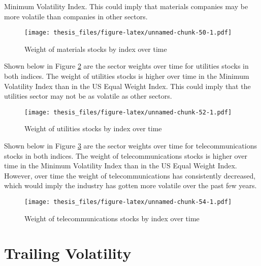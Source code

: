 \documentclass[12pt,twoside]{reedthesis}
\theoremstyle{definition}
\theoremstyle{definition}
\theoremstyle{definition}
\theoremstyle{remark}
\begin{document}
Minimum Volatility Index. This could imply that materials companies may
be more volatile than companies in other sectors.
\begin{figure}[htbp]
\centering
\texttt{[image: thesis\_files/figure-latex/unnamed-chunk-50-1.pdf]}
\caption{\label{fig:unnamed-chunk-50}Weight of materials stocks by index
over time\label{fig:sector8}}
\end{figure}
\newline
Shown below in Figure \ref{fig:sector9} are the sector weights over time
for utilities stocks in both indices. The weight of utilities stocks is
higher over time in the Minimum Volatility Index than in the US Equal
Weight Index. This could imply that the utilities sector may not be as
volatile as other sectors.
\begin{figure}[htbp]
\centering
\texttt{[image: thesis\_files/figure-latex/unnamed-chunk-52-1.pdf]}
\caption{\label{fig:unnamed-chunk-52}Weight of utilities stocks by index
over time\label{fig:sector9}}
\end{figure}
\clearpage
Shown below in Figure \ref{fig:sector10} are the sector weights over
time for telecommunications stocks in both indices. The weight of
telecommunications stocks is higher over time in the Minimum Volatility
Index than in the US Equal Weight Index. However, over time the weight
of telecommunications has consistently decreased, which would imply the
industry has gotten more volatile over the past few years.
\begin{figure}[htbp]
\centering
\texttt{[image: thesis\_files/figure-latex/unnamed-chunk-54-1.pdf]}
\caption{\label{fig:unnamed-chunk-54}Weight of telecommunications stocks by
index over time\label{fig:sector10}}
\end{figure}
\clearpage 

\section{Trailing Volatility}\label{trailing-volatility}
\end{document}
